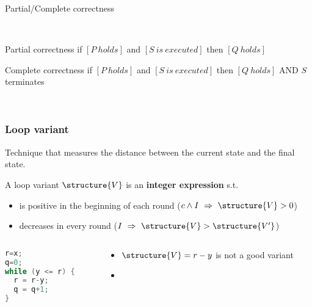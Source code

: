\documentclass[aspectratio=169]{beamer}
\begin{document}
\begin{frame}{Partial/Complete correctness}

~~\\[10mm]

\begin{alertblock}{Partial correctness}
  if $[P~holds]$ and $[S~is~executed]$ then $[Q~holds]$
\end{alertblock}

\begin{alertblock}{Complete correctness}
  if $[P~holds]$ and $[S~is~executed]$ then $[Q~holds]$ \alert{AND $S$ terminates}
\end{alertblock}

\pause
~

\end{frame}


\begin{frame}[fragile]\frametitle{Loop variant}
  
  Technique that measures the distance between the current state and the final state.

  \begin{block}{A loop variant $\structure{V}$ is an \textbf{integer expression} s.t.}
    \begin{itemize}
      \item is positive in the beginning of each round ($c \land I ~\Rightarrow~ \structure{V}>0$)
      \item decreases in every round ($I ~\Rightarrow~ \structure{V} > \structure{V'}$)
    \end{itemize}
  \end{block}

\begin{columns}
\begin{column}{0.48\textwidth}
\begin{lstlisting}[language=C++]
r=x;
q=0;
while (y <= r) {
  r = r-y;
  q = q+1;
}
\end{lstlisting}
\end{column}
\begin{column}{0.48\textwidth}
  \begin{itemize}
    \item $\structure{V} = r-y$ is not a good variant
    \item {}

  \end{itemize}
\end{column}
\end{columns}

\end{frame}
\end{document}
